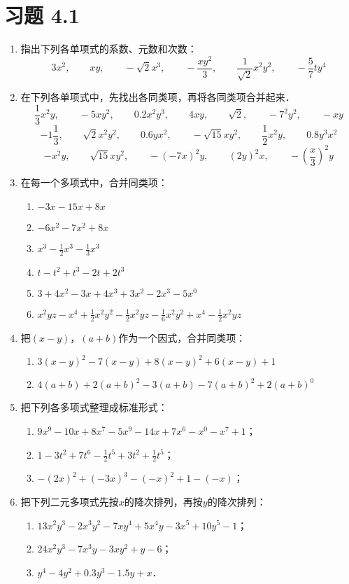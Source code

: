 \section*{习题 4.1}
\begin{enumerate}
    \item 指出下列各单项式的系数、元数和次数：
    \[3x^2,\qquad xy,\qquad -\sqrt{2}x^3,\qquad -\frac{xy^2}{3},\qquad \frac{1}{\sqrt{2}}x^2y^2,\qquad -\frac{5}{7}ty^4 \]
\item  在下列各单项式中，先找出各同类项，再将各同类项合并起来．
\[\frac{1}{3}x^2y,\qquad  -5xy^2,\qquad 0.2x^2y^3,\qquad  4xy,\qquad \sqrt{2},\qquad  -7^2y^2,\qquad  -xy\]
\[-1\frac{1}{3},\qquad  \sqrt{2}x^2y^2,\qquad  0.6yx^2,\qquad  -\sqrt{15}xy^2,\qquad  \frac{1}{2}x^2y,\qquad  0.8y^3x^2\]
\[-x^2y,\qquad \sqrt{15}xy^2,\qquad  -(-7x)^2 y,\qquad  (2y)^2x,\qquad -\left(\frac{x}{3}\right)^2y\]
\item  在每一个多项式中，合并同类项：
\begin{enumerate}
    \item $-3x-15x+8x$
    \item $-6x^2-7x^2+8x$
    \item $x^3-\frac{1}{2}x^3-\frac{1}{3}x^3$
    \item $t-t^2+t^3-2t+2t^3$
    \item $3+4x^2-3x+4x^3+3x^2-2x^3-5x^0$
    \item $x^2yz-x^4+\frac{1}{2}x^2y^2-\frac{1}{2}x^2yz-\frac{1}{6}x^2y^2+x^4-\frac{1}{2}x^2yz$
\end{enumerate}

\item 把$(x-y)$，$(a+b)$作为一个因式，合并同类项：
\begin{enumerate}
    \item $3(x-y)^2-7(x-y)+8(x-y)^2+6(x-y)+1$
    \item $4(a+b)+2(a+b)^2-3(a+b)-7(a+b)^2+2(a+b)^0$
\end{enumerate}

\item 把下列各多项式整理成标准形式：
\begin{enumerate}
    \item $9x^9-10x+8x^7-5x^9-14x+7x^6-x^0-x^7+1$；
    \item $1-3t^2+7t^6-\frac{1}{2}t^5+3t^2+\frac{1}{2}t^5$；
    \item $-(2x)^2+(-3x)^3-(-x)^2+1-(-x)$；
\end{enumerate}

\item 把下列二元多项式先按$x$的降次排列，再按$y$的降次排列：
\begin{enumerate}
    \item $13x^2y^3-2x^3y^2-7xy^4+5x^4y-3x^5+10y^5-1$；
    \item $24x^2y^3-7x^3y-3xy^2+y-6$；
    \item $y^4-4y^2+0.3y^3-1.5y+x$．
\end{enumerate}



\end{enumerate}
